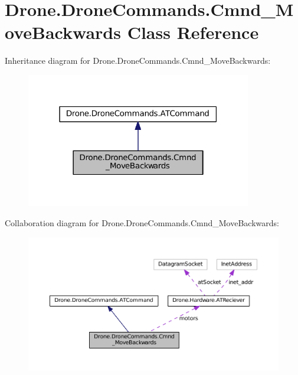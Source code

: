\hypertarget{class_drone_1_1_drone_commands_1_1_cmnd___move_backwards}{}\section{Drone.\+Drone\+Commands.\+Cmnd\+\_\+\+Move\+Backwards Class Reference}
\label{class_drone_1_1_drone_commands_1_1_cmnd___move_backwards}


Inheritance diagram for Drone.\+Drone\+Commands.\+Cmnd\+\_\+\+Move\+Backwards\+:\nopagebreak
\begin{figure}[H]
\begin{center}
\leavevmode
\includegraphics[width=279pt]{class_drone_1_1_drone_commands_1_1_cmnd___move_backwards__inherit__graph}
\end{center}
\end{figure}


Collaboration diagram for Drone.\+Drone\+Commands.\+Cmnd\+\_\+\+Move\+Backwards\+:\nopagebreak
\begin{figure}[H]
\begin{center}
\leavevmode
\includegraphics[width=350pt]{class_drone_1_1_drone_commands_1_1_cmnd___move_backwards__coll__graph}
\end{center}
\end{figure}
